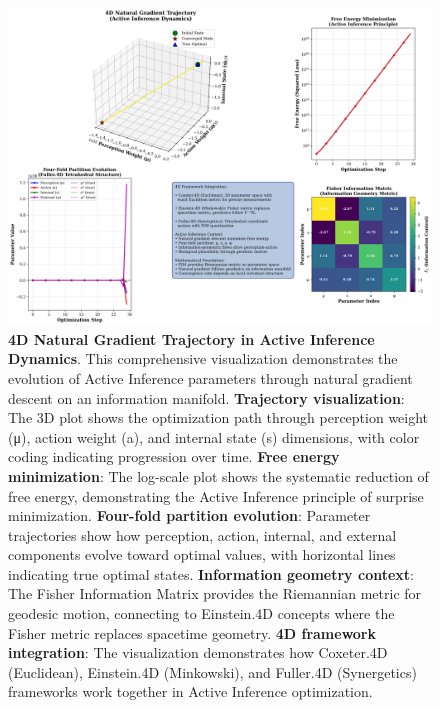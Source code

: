\documentclass[
  10pt,
]{article}
\begin{document}
\begin{figure}
\centering
\includegraphics{../output/figures/figure_13_4d_trajectory.png}
\caption{\textbf{4D Natural Gradient Trajectory in Active Inference
Dynamics}. This comprehensive visualization demonstrates the evolution
of Active Inference parameters through natural gradient descent on an
information manifold. \textbf{Trajectory visualization}: The 3D plot
shows the optimization path through perception weight (μ), action weight
(a), and internal state (s) dimensions, with color coding indicating
progression over time. \textbf{Free energy minimization}: The log-scale
plot shows the systematic reduction of free energy, demonstrating the
Active Inference principle of surprise minimization. \textbf{Four-fold
partition evolution}: Parameter trajectories show how perception,
action, internal, and external components evolve toward optimal values,
with horizontal lines indicating true optimal states.
\textbf{Information geometry context}: The Fisher Information Matrix
provides the Riemannian metric for geodesic motion, connecting to
Einstein.4D concepts where the Fisher metric replaces spacetime
geometry. \textbf{4D framework integration}: The visualization
demonstrates how Coxeter.4D (Euclidean), Einstein.4D (Minkowski), and
Fuller.4D (Synergetics) frameworks work together in Active Inference
optimization.}
\end{figure}
\end{document}
